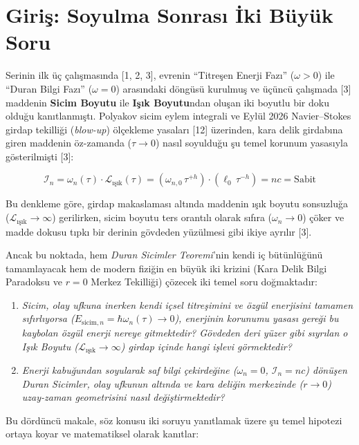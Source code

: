 \documentclass[12pt,a4paper]{article}
\begin{document}
\section{Giriş: Soyulma Sonrası İki Büyük Soru}

Serinin ilk üç çalışmasında [1, 2, 3], evrenin ``Titreşen Enerji Fazı'' ($\omega > 0$) ile ``Duran Bilgi Fazı'' ($\omega = 0$) arasındaki döngüsü kurulmuş ve üçüncü çalışmada [3] maddenin \textbf{Sicim Boyutu} ile \textbf{Işık Boyutu}ndan oluşan iki boyutlu bir doku olduğu kanıtlanmıştı. Polyakov sicim eylem integrali ve Eylül 2026 Navier--Stokes girdap tekilliği (\textit{blow-up}) ölçekleme yasaları [12] üzerinden, kara delik girdabına giren maddenin öz-zamanda ($\tau \to 0$) nasıl soyulduğu şu temel korunum yasasıyla gösterilmişti [3]:

\begin{equation}
\mathcal{I}_n = \omega_n(\tau) \cdot \mathcal{L}_{\text{ışık}}(\tau) = \left( \omega_{n,0} \, \tau^{+h} \right) \cdot \left( \ell_0 \, \tau^{-h} \right) = n c = \text{Sabit}
\end{equation}

Bu denkleme göre, girdap makaslaması altında maddenin ışık boyutu sonsuzluğa ($\mathcal{L}_{\text{ışık}} \to \infty$) gerilirken, sicim boyutu ters orantılı olarak sıfıra ($\omega_n \to 0$) çöker ve madde dokusu tıpkı bir derinin gövdeden yüzülmesi gibi ikiye ayrılır [3].

Ancak bu noktada, hem \textit{Duran Sicimler Teoremi}'nin kendi iç bütünlüğünü tamamlayacak hem de modern fiziğin en büyük iki krizini (Kara Delik Bilgi Paradoksu ve $r=0$ Merkez Tekilliği) çözecek iki temel soru doğmaktadır:
\begin{enumerate}
    \item \textit{Sicim, olay ufkuna inerken kendi içsel titreşimini ve özgül enerjisini tamamen sıfırlıyorsa ($E_{\text{sicim}, n} = \hbar \omega_n(\tau) \to 0$), enerjinin korunumu yasası gereği bu kaybolan özgül enerji nereye gitmektedir? Gövdeden deri yüzer gibi sıyrılan o Işık Boyutu ($\mathcal{L}_{\text{ışık}} \to \infty$) girdap içinde hangi işlevi görmektedir?}
    \item \textit{Enerji kabuğundan soyularak saf bilgi çekirdeğine ($\omega_n = 0$, $\mathcal{I}_n = n c$) dönüşen Duran Sicimler, olay ufkunun altında ve kara deliğin merkezinde ($r \to 0$) uzay-zaman geometrisini nasıl değiştirmektedir?}
\end{enumerate}

Bu dördüncü makale, söz konusu iki soruyu yanıtlamak üzere şu temel hipotezi ortaya koyar ve matematiksel olarak kanıtlar:
\end{document}
